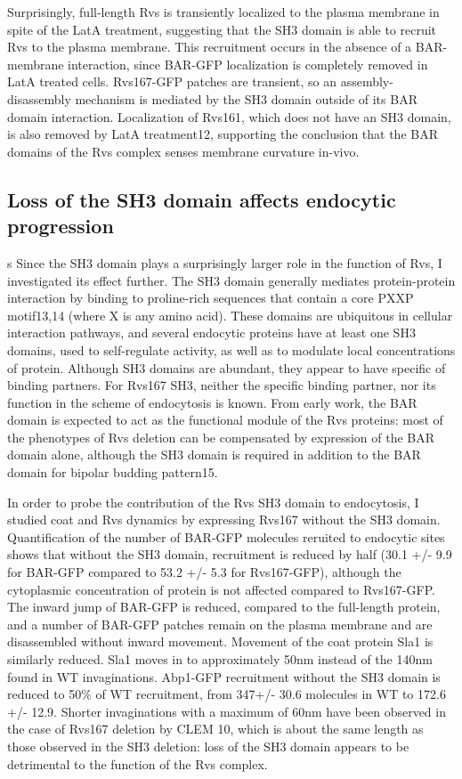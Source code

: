 	\vspace{5mm}
Surprisingly, full-length Rvs is transiently localized to the plasma membrane in spite of the LatA treatment, suggesting that the SH3 domain is able to recruit Rvs to the plasma membrane. This recruitment occurs in the absence of a BAR-membrane interaction, since BAR-GFP localization is completely removed in LatA treated cells. Rvs167-GFP patches are transient, so an assembly-disassembly mechanism is mediated by the SH3 domain outside of its BAR domain interaction. Localization of Rvs161, which does not have an SH3 domain, is also removed by LatA treatment12, supporting the conclusion that the BAR domains of the Rvs complex senses membrane curvature in-vivo. 

	\subsection{Loss of the SH3 domain affects endocytic progression}s
Since the SH3 domain plays a surprisingly larger role in the function of Rvs, I investigated its effect further. The SH3 domain generally mediates protein-protein interaction by binding to proline-rich sequences that contain a core PXXP motif13,14 (where X is any amino acid). These domains are ubiquitous in cellular interaction pathways, and several endocytic proteins have at least one SH3 domains, used to self-regulate activity, as well as to modulate local concentrations of protein. Although SH3 domains are abundant, they appear to have specific of binding partners. For Rvs167 SH3, neither the specific binding partner, nor its function in the scheme of endocytosis is known. From early work, the BAR domain is expected to act as the functional module of the Rvs proteins: most of the phenotypes of Rvs deletion can be compensated by expression of the BAR domain alone, although the SH3 domain is required in addition to the BAR domain for bipolar budding pattern15. 

	\vspace{5mm}
In order to probe the contribution of the Rvs SH3 domain to endocytosis, I studied coat and Rvs dynamics by expressing Rvs167 without the SH3 domain. Quantification of the number of BAR-GFP molecules reruited to endocytic sites shows that without the SH3 domain, recruitment is reduced by half (30.1 +/- 9.9 for BAR-GFP compared to 53.2 +/- 5.3 for Rvs167-GFP), although the cytoplasmic concentration of protein is not affected compared to Rvs167-GFP. The inward jump of BAR-GFP is reduced, compared to the full-length protein, and a number of BAR-GFP patches remain on the plasma membrane and are disassembled without inward movement. Movement of the coat protein Sla1 is similarly reduced. Sla1 moves in to approximately 50nm instead of the 140nm found in WT invaginations. Abp1-GFP recruitment without the SH3 domain is reduced to 50\% of WT recruitment, from 347+/- 30.6 molecules in WT to 172.6 +/- 12.9. Shorter invaginations with a maximum of 60nm have been observed in the case of Rvs167 deletion by CLEM 10, which is about the same length as those observed in the SH3 deletion: loss of the SH3 domain appears to be detrimental to the function of the Rvs complex.

